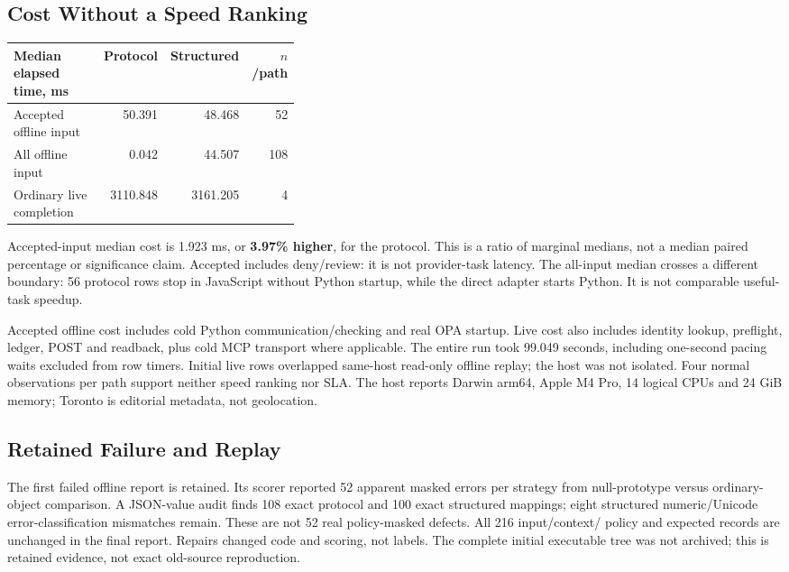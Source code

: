 \documentclass[11pt,letterpaper]{article}
\begin{document}
\subsection{Cost Without a Speed Ranking}

\begin{center}
\small
\begin{tabular}{@{}p{0.37\linewidth}rrr@{}}
\hline
Median elapsed time, ms & Protocol & Structured & $n$/path \\
\hline
Accepted offline input & 50.391 & 48.468 & 52 \\
All offline input & 0.042 & 44.507 & 108 \\
Ordinary live completion & 3110.848 & 3161.205 & 4 \\
\hline
\end{tabular}
\end{center}

Accepted-input median cost is 1.923 ms, or \textbf{3.97\% higher}, for the
protocol. This is a ratio of marginal medians, not a median paired percentage
or significance claim. Accepted includes deny/review: it is not provider-task
latency. The all-input median crosses a different boundary: 56 protocol rows
stop in JavaScript without Python startup, while the direct adapter starts
Python. It is not comparable useful-task speedup.

Accepted offline cost includes cold Python communication/checking and real OPA
startup. Live cost also includes identity lookup, preflight, ledger, POST and
readback, plus cold MCP transport where applicable. The entire run took
99.049 seconds, including one-second pacing waits excluded from row timers.
Initial live rows overlapped same-host read-only offline replay; the host was
not isolated. Four normal observations per path support neither speed ranking
nor SLA. The host reports Darwin arm64, Apple M4 Pro, 14 logical CPUs and
24 GiB memory; Toronto is editorial metadata, not geolocation.

\subsection{Retained Failure and Replay}

The first failed offline report is retained. Its scorer reported 52 apparent
masked errors per strategy from null-prototype versus ordinary-object
comparison. A JSON-value audit finds 108 exact protocol and 100 exact structured
mappings; eight structured numeric/Unicode error-classification mismatches
remain. These are not 52 real policy-masked defects. All 216 input/context/
policy and expected records are unchanged in the final report. Repairs changed
code and scoring, not labels. The complete initial executable tree was not
archived; this is retained evidence, not exact old-source reproduction.
\end{document}
